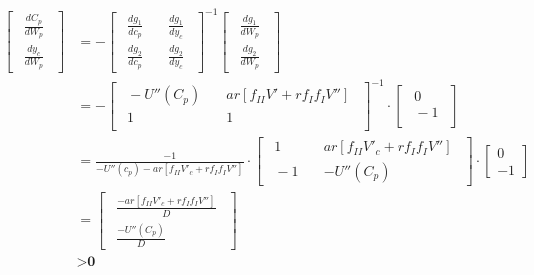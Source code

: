 \begin{align*}
\begin{bmatrix}
    \ \ \frac{dC_p}{dW_p}\ \ \\
    \ \ \frac{dy_c}{dW_p}\ \
\end{bmatrix} &= - \begin{bmatrix}
                    \ \ \frac{dg_1}{dc_p} \quad &\frac{dg_1}{dy_c}\ \ \\
                    \ \ \frac{dg_2}{dc_p} \quad &\frac{dg_2}{dy_c}\ \
                  \end{bmatrix}^{-1} \begin{bmatrix}
                                        \ \ \frac{dg_1}{dW_p}\ \ \\
                                        \ \ \frac{dg_2}{dW_p}\ \
                                     \end{bmatrix} \\
              &= - \begin{bmatrix}
                        \ \ -U''(C_p) \quad &a r [f_{II} V' + r f_I f_I V'']\ \ \\
                        \ \ 1 \quad &1\ \ \\
                    \end{bmatrix}^{-1} \cdot \begin{bmatrix}
                                                \ \ 0 \ \ \\
                                                \ \ -1 \ \ \\
                                             \end{bmatrix} \\
              &= \frac{-1}{-U''(c_p) - a r [f_{II} V'_c + r f_I f_I V'']} \cdot \begin{bmatrix}
                                                                                                    \ \ 1 \quad &a r [f_{II} V'_c + r f_I f_I V'']\ \ \\
                                                                                                    \ \ -1 \quad &-U''(C_p)\ \
                                                                                                \end{bmatrix} \cdot \begin{bmatrix}
                                                                                                    0 \\
                                                                                                    -1
                                                                                                \end{bmatrix} \\
              &= \begin{bmatrix}
                    \ \ \frac{- a r [f_{II} V'_c + r f_I f_I V'']}{D}\ \ \\
                    \ \ \frac{-U''(C_p)}{D}\ \
                 \end{bmatrix} \\ & > \textbf{0}
\end{align*}

